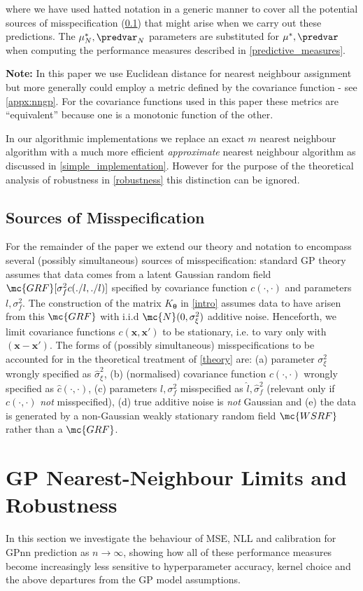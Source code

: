 where we have used hatted notation in a generic manner to cover all the potential sources of misspecification (\ref{misspec}) that might arise when we carry out these predictions. The $\mu_N^*,\predvar_N$ parameters are substituted for $\mu^*,\predvar$ when computing the performance measures described in \autoref{predictive_measures}.

\textbf{Note:} In this paper we use Euclidean distance for nearest neighbour assignment but more generally could employ a metric defined by the covariance function - see \ref{appx:nngp}. For the covariance functions  used in this paper these metrics are ``equivalent'' because one is a monotonic function of the other.


In our algorithmic implementations we replace an exact $m$ nearest neighbour algorithm with a much more efficient {\it approximate} nearest neighbour algorithm as discussed in \autoref{simple_implementation}. However for the purpose of the theoretical analysis of robustness in \autoref{robustness} this distinction can be ignored. 

\subsection{Sources of Misspecification}
\label{misspec}
For the remainder of the paper we extend our theory and notation to encompass several (possibly simultaneous) sources of misspecification: standard GP theory assumes that data comes from a latent Gaussian random field $\mc{GRF}[\sigma_f^2 c(./l,./l)]$ specified by covariance function $c(\cdot,\cdot)$ and parameters $l,\sigma_f^2$. The construction of the matrix $K_{\bm{\theta}}$ in \autoref{intro} assumes data to have arisen from this $\mc{GRF}$ with i.i.d $\mc{N}(0,\sigma_\xi^2)$ additive noise. Henceforth, we limit covariance functions $c(\bm{x},\bm{x}')$ to be stationary, i.e. to vary only with $(\bm{x}-\bm{x}')$. The forms of (possibly simultaneous) misspecifications to be accounted for in the theoretical treatment of \ref{theory} are: (a) parameter $\sigma_\xi^2$ wrongly specified as $\hat{\sigma}_\xi^2$, (b) (normalised) covariance function $c(\cdot,\cdot)$ wrongly specified as $\hat{c}(\cdot,\cdot)$, (c) parameters $l,\sigma_f^2$ misspecified as $\hat{l},\hat{\sigma}_f^2$ (relevant only if $c(\cdot,\cdot)$ {\it not} misspecified), (d) true additive noise is {\it not} Gaussian and (e) the data is generated by a non-Gaussian weakly stationary random field $\mc{WSRF}$ rather than a $\mc{GRF}$.

\section{GP Nearest-Neighbour Limits and Robustness}
\label{robustness}
In this section we investigate the behaviour of MSE, NLL and calibration for GPnn prediction as $n \rightarrow \infty$, showing how all of these performance measures become increasingly less sensitive to hyperparameter accuracy, kernel choice and the above departures from the GP model assumptions. 

